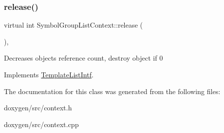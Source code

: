 \mbox{\label{class_symbol_group_list_context_a109a389eaead2b786cf4e7d607652e67}} 
\subsubsection{\texorpdfstring{release()}{release()}}
{\footnotesize\ttfamily virtual int Symbol\+Group\+List\+Context\+::release (\begin{DoxyParamCaption}{ }\end{DoxyParamCaption})\hspace{0.3cm}{\ttfamily [inline]}, {\ttfamily [virtual]}}

Decreases object\textquotesingle{}s reference count, destroy object if 0 

Implements \mbox{\hyperlink{class_template_list_intf_a0c53169c740c09dac47efc62bbe39674}{Template\+List\+Intf}}.



The documentation for this class was generated from the following files\+:\begin{DoxyCompactItemize}
\item 
doxygen/src/context.\+h\item 
doxygen/src/context.\+cpp\end{DoxyCompactItemize}
